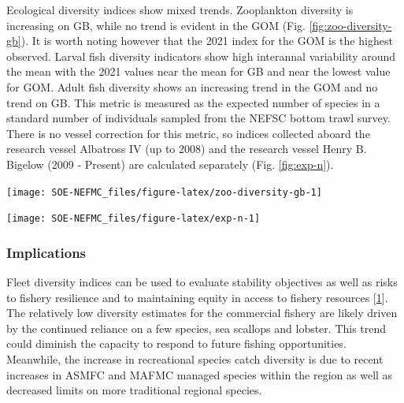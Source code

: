 \documentclass[
  10pt,
]{article}
\let\origfigure\figure
\let\endorigfigure\endfigure
\renewenvironment{figure}[1][2] {
    \expandafter\origfigure\expandafter[H]
} {
    \endorigfigure
}
\begin{document}
Ecological diversity indices show mixed trends. Zooplankton diversity is increasing on GB, while no trend is evident in the GOM (Fig. \ref{fig:zoo-diversity-gb}). It is worth noting however that the 2021 index for the GOM is the highest observed. Larval fish diversity indicators show high interannal variability around the mean with the 2021 values near the mean for GB and near the lowest value for GOM. Adult fish diversity shows an increasing trend in the GOM and no trend on GB. This metric is measured as the expected number of species in a standard number of individuals sampled from the NEFSC bottom trawl survey. There is no vessel correction for this metric, so indices collected aboard the research vessel Albatross IV (up to 2008) and the research vessel Henry B. Bigelow (2009 - Present) are calculated separately (Fig. \ref{fig:exp-n}).

\begin{figure}

{\centering \texttt{[image: SOE-NEFMC\_files/figure-latex/zoo-diversity-gb-1]} 

}

\caption{Zooplankton diversity on Georges Bank and in the Gulf of Maine, based on Shannon diversity index. 2020 surveys were incomplete due to COVID-19.}\label{fig:zoo-diversity-gb}
\end{figure}

\begin{figure}

{\centering \texttt{[image: SOE-NEFMC\_files/figure-latex/exp-n-1]} 

}

\caption{Adult fish diversity for Georges Bank and in the Gulf of Maine, based on expected number of species. Results from survey vessels Albatross and Bigelow are reported separately due to catchability differences.}\label{fig:exp-n}
\end{figure}

\hypertarget{implications-3}{%
\subsubsection{Implications}\label{implications-3}}

Fleet diversity indices can be used to evaluate stability objectives as well as risks to fishery resilience and to maintaining equity in access to fishery resources {[}\protect\hyperlink{ref-gaichas_implementing_2018}{1}{]}. The relatively low diversity estimates for the commercial fishery are likely driven by the continued reliance on a few species, sea scallops and lobster. This trend could diminish the capacity to respond to future fishing opportunities. Meanwhile, the increase in recreational species catch diversity is due to recent increases in ASMFC and MAFMC managed species within the region as well as decreased limits on more traditional regional species.
\end{document}
